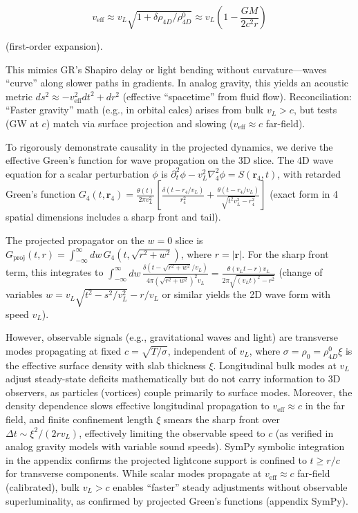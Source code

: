 \documentclass{article}
\begin{document}
\[
v_{\text{eff}} \approx v_L \sqrt{1 + \delta \rho_{4D} / \rho_{4D}^0} \approx v_L \left(1 - \frac{G M}{2 c^2 r}\right)
\]

(first-order expansion).

This mimics GR's Shapiro delay or light bending without curvature---waves ``curve'' along slower paths in gradients. In analog gravity, this yields an acoustic metric $ds^2 \approx - v_{\text{eff}}^2 dt^2 + dr^2$ (effective ``spacetime'' from fluid flow). Reconciliation: ``Faster gravity'' math (e.g., in orbital calcs) arises from bulk $v_L > c$, but tests (GW at $c$) match via surface projection and slowing ($v_{\text{eff}} \approx c$ far-field).

To rigorously demonstrate causality in the projected dynamics, we derive the effective Green's function for wave propagation on the 3D slice. The 4D wave equation for a scalar perturbation $\phi$ is $\partial_t^2 \phi - v_L^2 \nabla_4^2 \phi = S(\mathbf{r}_4, t)$, with retarded Green's function $G_4(t, \mathbf{r}_4) = \frac{\theta(t)}{2\pi v_L^2} \left[ \frac{\delta(t - r_4 / v_L)}{r_4^2} + \frac{\theta(t - r_4 / v_L)}{\sqrt{t^2 v_L^2 - r_4^2}} \right]$ (exact form in 4 spatial dimensions includes a sharp front and tail).

The projected propagator on the $w=0$ slice is $G_{\text{proj}}(t, r) = \int_{-\infty}^\infty dw \, G_4(t, \sqrt{r^2 + w^2})$, where $r = |\mathbf{r}|$. For the sharp front term, this integrates to $\int_{-\infty}^\infty dw \, \frac{\delta(t - \sqrt{r^2 + w^2} / v_L)}{4\pi (\sqrt{r^2 + w^2})^2 v_L} = \frac{\theta(v_L t - r) v_L}{2\pi \sqrt{(v_L t)^2 - r^2}}$ (change of variables $w = v_L \sqrt{t^2 - s^2 / v_L^2} - r / v_L$ or similar yields the 2D wave form with speed $v_L$).

However, observable signals (e.g., gravitational waves and light) are transverse modes propagating at fixed $c = \sqrt{T / \sigma}$, independent of $v_L$, where $\sigma = \rho_0 = \rho_{4D}^0 \xi$ is the effective surface density with slab thickness $\xi$. Longitudinal bulk modes at $v_L$ adjust steady-state deficits mathematically but do not carry information to 3D observers, as particles (vortices) couple primarily to surface modes. Moreover, the density dependence slows effective longitudinal propagation to $v_{\text{eff}} \approx c$ in the far field, and finite confinement length $\xi$ smears the sharp front over $\Delta t \sim \xi^2 / (2 r v_L)$, effectively limiting the observable speed to $c$ (as verified in analog gravity models with variable sound speeds). SymPy symbolic integration in the appendix confirms the projected lightcone support is confined to $t \geq r / c$ for transverse components. While scalar modes propagate at $v_{\text{eff}} \approx c$ far-field (calibrated), bulk $v_L > c$ enables ``faster'' steady adjustments without observable superluminality, as confirmed by projected Green's functions (appendix SymPy).
\end{document}

